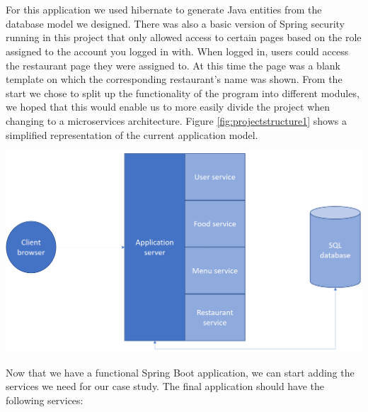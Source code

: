\documentclass[12pt]{article}
\newenvironment{Figure}
	{\par\medskip\noindent\minipage{\linewidth}}
	{\endminipage\par\medskip}
\begin{document}
\begin{multicols}{2}
\\\\
For this application we used hibernate to generate Java entities from the database model we designed. There was also a basic version of Spring security running in this project that only allowed access to certain pages based on the role assigned to the account you logged in with. When logged in, users could access the restaurant page they were assigned to. At this time the page was a blank template on which the corresponding restaurant's name was shown. From the start we chose to split up the functionality of the program into different modules, we hoped that this would enable us to more easily divide the project when changing to a microservices architecture. Figure \ref{fig:projectstructure1} shows a simplified representation of the current application model.
\begin{Figure}
	\centering
	\includegraphics[width=\linewidth]{illustrations/projectstructure1.png}
	\label{fig:projectstructure1}
\end{Figure}
\noindent Now that we have a functional Spring Boot application, we can start adding the services we need for our case study. The final application should have the following services:


\end{multicols}
\end{document}
